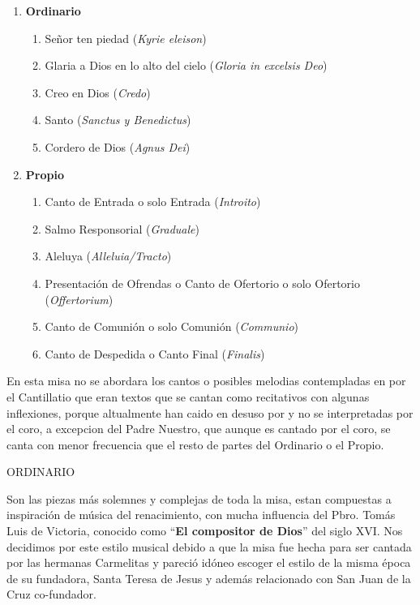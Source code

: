 \documentclass[12pt, letterpaper]{report}
\begin{document}
    \renewcommand{\theenumi}{\arabic{enumi}}
    \begin{enumerate}
        \item \textbf{Ordinario}
        \begin{enumerate}
            \item Se\~nor ten piedad (\textit{Kyrie eleison})
            \item Glaria a Dios en lo alto del cielo (\textit{Gloria in excelsis Deo})
            \item Creo en Dios (\textit{Credo})
            \item Santo (\textit{Sanctus y Benedictus})
            \item Cordero de Dios (\textit{Agnus Dei})
        \end{enumerate}

        \item \textbf{Propio}
        \begin{enumerate}
            \item Canto de Entrada o solo Entrada (\textit{Introito})
            \item Salmo Responsorial (\textit{Graduale})
            \item Aleluya (\textit{Alleluia/Tracto})
            \item Presentaci\'on de Ofrendas o Canto de Ofertorio o solo Ofertorio (\textit{Offertorium})
            \item Canto de Comuni\'on o solo Comuni\'on (\textit{Communio})
            \item Canto de Despedida o Canto Final (\textit{Finalis})
        \end{enumerate}
    \end{enumerate}

    En esta misa no se abordara los cantos o posibles melodias contempladas en por el Cantillatio que eran textos que se cantan como recitativos con algunas inflexiones, porque altualmente han caido en desuso por y no se interpretadas por el coro, a excepcion del Padre Nuestro, que aunque es cantado por el coro, se canta con menor frecuencia que el resto de partes del Ordinario o el Propio.

    {\large ORDINARIO}

    Son las piezas m\'as solemnes y complejas de toda la misa, estan compuestas a inspiraci\'on de m\'usica del renacimiento, con mucha influencia del Pbro. Tom\'as Luis de Victoria, conocido como ``\textbf{El compositor de Dios}'' del siglo XVI. Nos decidimos por este estilo musical debido a que la misa fue hecha para ser cantada por las hermanas Carmelitas y pareci\'o id\'oneo escoger el estilo de la misma \'epoca de su fundadora, Santa Teresa de Jesus y adem\'as relacionado con San Juan de la Cruz co-fundador.
\end{document}
